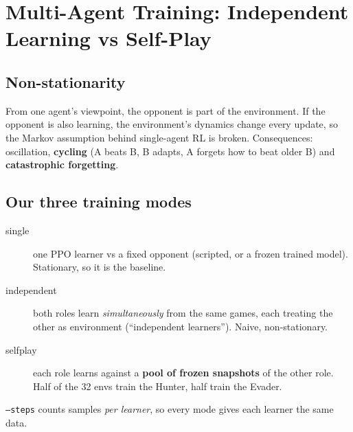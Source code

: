 \documentclass[11pt,a4paper]{article}
\begin{document}
\section{Multi-Agent Training: Independent Learning vs Self-Play}

\subsection{Non-stationarity}
From one agent's viewpoint, the opponent is part of the environment. If the opponent is also
learning, the environment's dynamics change every update, so the Markov assumption behind
single-agent RL is broken. Consequences: oscillation, \textbf{cycling} (A beats B, B adapts,
A forgets how to beat older B) and \textbf{catastrophic forgetting}.

\subsection{Our three training modes}
\begin{description}
  \item[single] one PPO learner vs a fixed opponent (scripted, or a frozen trained model).
        Stationary, so it is the baseline.
  \item[independent] both roles learn \emph{simultaneously} from the same games, each treating
        the other as environment (``independent learners''). Naive, non-stationary.
  \item[selfplay] each role learns against a \textbf{pool of frozen snapshots} of the other role.
        Half of the 32 envs train the Hunter, half train the Evader.
\end{description}
\texttt{--steps} counts samples \emph{per learner}, so every mode gives each learner the same data.
\end{document}
